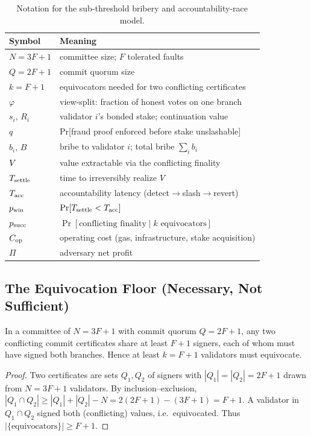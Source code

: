 \begin{table}[t]
\centering
\caption{Notation for the sub-threshold bribery and accountability-race model.}
\label{tab:notation}
\small
\begin{tabularx}{\linewidth}{@{}lX@{}}
\toprule
Symbol & Meaning \\
\midrule
$N=3F+1$ & committee size; $F$ tolerated faults \\
$Q=2F+1$ & commit quorum size \\
$k=F+1$ & equivocators needed for two conflicting certificates \\
$\varphi$ & view-split: fraction of honest votes on one branch \\
$s_i,\,R_i$ & validator $i$'s bonded stake; continuation value \\
$q$ & Pr[fraud proof enforced before stake unslashable] \\
$b_i,\,B$ & bribe to validator $i$; total bribe $\sum_i b_i$ \\
$V$ & value extractable via the conflicting finality \\
$T_{\mathrm{settle}}$ & time to irreversibly realize $V$ \\
$T_{\mathrm{acc}}$ & accountability latency (detect$\rightarrow$slash$\rightarrow$revert) \\
$p_{\mathrm{win}}$ & $\Pr[T_{\mathrm{settle}} < T_{\mathrm{acc}}]$ \\
$p_{\mathrm{succ}}$ & $\Pr[\text{conflicting finality}\mid k\text{ equivocators}]$ \\
$C_{\mathrm{op}}$ & operating cost (gas, infrastructure, stake acquisition) \\
$\Pi$ & adversary net profit \\
\bottomrule
\end{tabularx}
\end{table}

\subsection{The Equivocation Floor (Necessary, Not Sufficient)}
\label{sec:floor}

\begin{lemma}\label{lem:intersection}
In a committee of $N=3F+1$ with commit quorum $Q=2F+1$, any two conflicting commit certificates
share at least $F+1$ signers, each of whom must have signed both branches. Hence at least
$k=F+1$ validators must equivocate.
\end{lemma}
\begin{proof}
Two certificates are sets $Q_1,Q_2$ of signers with $|Q_1|=|Q_2|=2F+1$ drawn from $N=3F+1$ validators.
By inclusion--exclusion, $|Q_1\cap Q_2|\ge |Q_1|+|Q_2|-N = 2(2F+1)-(3F+1)=F+1$. A validator in
$Q_1\cap Q_2$ signed both (conflicting) values, i.e.\ equivocated. Thus $|\{\text{equivocators}\}|\ge F+1$.
\end{proof}

